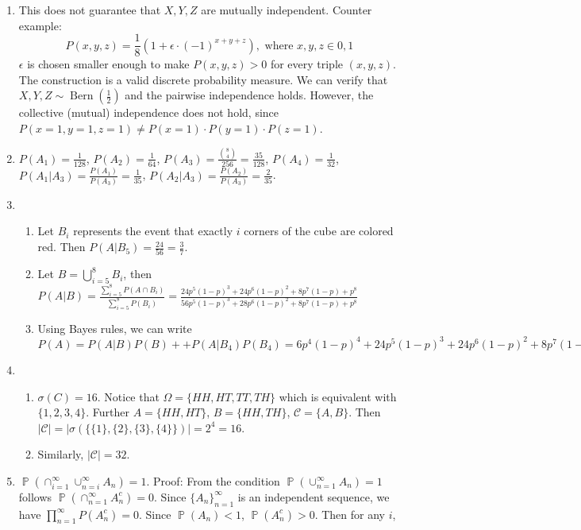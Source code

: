 \documentclass{article}
\DeclareMathOperator{\bP}{\mathbb{P}}
\DeclareMathOperator{\Bern}{Bern}
\begin{document}
\courseheader
{}

\begin{enumerate}
\item This does not guarantee that
$X,Y,Z$ are mutually independent.
Counter example:
$$
P(x,y,z)= \frac{1}{8} (1+\epsilon\cdot (-1)^{x+y+z}), \textrm{ where } x,y,z \in {0,1}
$$
$\epsilon$ is chosen smaller enough to make
$P(x,y,z) > 0$ for every triple $(x,y,z)$.
The construction is a valid discrete probability measure.
We can verify that $X,Y,Z \sim \Bern(\frac{1}{2})$ and the pairwise independence holds. However, the
collective (mutual) independence does not hold, since $P(x=1,y=1,z=1)\neq P(x=1)\cdot
P(y=1)\cdot P(z=1)$.
\item $P(A_1)=\frac{1}{128}$, $P(A_2)=\frac{1}{64}$,
$P(A_3)=\frac{\binom{8}{4}}{256}=\frac{35}{128}$, $P(A_4)=\frac{1}{32}$, $P(A_1| A_3)
=\frac{P(A_1)}{P(A_3)}=\frac{1}{35}$,
$P(A_2|A_3)=\frac{P(A_2)}{P(A_3)}=\frac{2}{35}$.
\item
\begin{enumerate}
    \item Let $B_i$ represents the event that exactly $i$ corners
    of the cube are colored red.
    Then $P(A|B_5) = \frac{24}{56}=\frac{3}{7}$.
    \item Let $B=\bigcup_{i=5}^8 B_i$, then $P(A|B)=\frac{\sum_{i=5}^8 P(A\cap B_i)}{\sum_{i=5}^8 P(B_i)} =\frac{24p^5(1-p)^3 + 24 p^6(1-p)^2  + 8 p^7(1-p) + p^8}{56p^5(1-p)^3 + 28 p^6(1-p)^2 + 8 p^7(1-p) + p^8}$
\item Using Bayes rules, we can write $P(A)=P(A|B)P(B)+
+P(A|B_4)P(B_4)=6p^4(1-p)^4+24p^5(1-p)^3 + 24 p^6(1-p)^2  + 8 p^7(1-p) + p^8$
\end{enumerate}
\item
\begin{enumerate}
    \item $\sigma(C)=16$. Notice that 
    $\Omega=\{HH,HT,TT,TH\}$ which is equivalent with
    $\{1,2,3,4\}$. Further
    $A=\{HH,HT\}$, $B=\{HH,TH\}$, $\mathcal{C}=\{A,B\}$.
    Then $|\mathcal{C}| = |\sigma(\{ \{1\},\{2\},\{3\},\{4\}\})|
    =2^4=16$.
    \item Similarly, $|\mathcal{C}| = 32$.
\end{enumerate}
\item $\bP(\cap_{i=1}^{\infty} \cup_{n=i}^{\infty} A_n ) 
=1$. Proof: From the condition
$\bP(\cup_{n=1}^{\infty} A_n) = 1$ follows 
$\bP(\cap_{n=1}^{\infty} A^c_n) = 0$.
Since $\{A_n\}_{n=1}^{\infty}$
is an independent sequence,
we have $\prod_{n=1}^{\infty} P(A_n^c)=0$.
Since $\bP(A_n)<1$, $\bP(A_n^c)>0$. Then for any $i$,

\end{enumerate}
\end{document}
